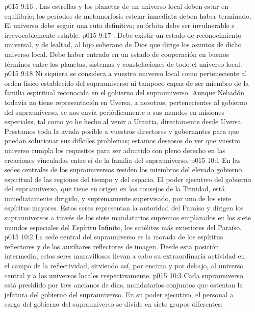 \vs p015 9:16 . Las estrellas y los planetas de un universo local deben estar en equilibrio; los períodos de metamorfosis estelar inmediata deben haber terminado. El universo debe seguir una ruta definitiva; su órbita debe ser invulnerable e irrevocablemente estable.
\vs p015 9:17 . Debe existir un estado de reconocimiento universal, y de lealtad, al hijo soberano de Dios que dirige los asuntos de dicho universo local. Debe haber entrado en un estado de cooperación en buenos términos entre los planetas, sistemas y constelaciones de todo el universo local.
\vs p015 9:18 \pc Ni siquiera se considera a vuestro universo local como perteneciente al orden físico establecido del suprauniverso ni tampoco capaz de ser miembro de la familia espiritual reconocida en el gobierno del suprauniverso. Aunque Nebadón todavía no tiene representación en Uversa, a nosotros, pertenecientes al gobierno del suprauniverso, se nos envía periódicamente a sus mundos en misiones especiales, tal como yo he hecho al venir a Urantia, directamente desde Uversa. Prestamos toda la ayuda posible a vuestros directores y gobernantes para que puedan solucionar sus difíciles problemas; estamos deseosos de ver que vuestro universo cumpla los requisitos para ser admitido con pleno derecho en las creaciones vinculadas entre sí de la familia del suprauniverso.
\vs p015 10:1 En las sedes centrales de los suprauniversos residen los miembros del elevado gobierno espiritual de las regiones del tiempo y del espacio. El poder ejecutivo del gobierno del suprauniverso, que tiene su origen en los consejos de la Trinidad, está inmediatamente dirigido, y supremamente supervisado, por uno de los siete espíritus mayores. Estos seres representan la autoridad del Paraíso y dirigen los suprauniversos a través de los siete mandatarios supremos emplazados en los siete mundos especiales del Espíritu Infinito, los satélites más exteriores del Paraíso.
\vs p015 10:2 La sede central del suprauniverso es la morada de los espíritus reflectores y de los auxiliares reflectores de imagen. Desde esta posición intermedia, estos seres maravillosos llevan a cabo su extraordinaria actividad en el campo de la reflectividad, sirviendo así, por encima y por debajo, al universo central y a los universos locales respectivamente.
\vs p015 10:3 \pc Cada suprauniverso está presidido por tres ancianos de días, mandatarios conjuntos que ostentan la jefatura del gobierno del suprauniverso. En su poder ejecutivo, el personal a cargo del gobierno del suprauniverso se divide en siete grupos diferentes:
